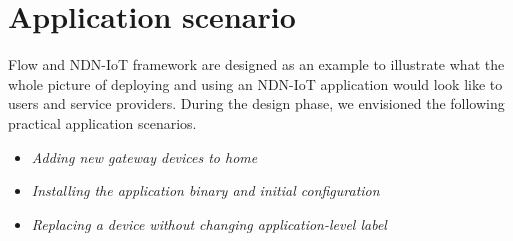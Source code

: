 \section{Application scenario}
\label{sec:scenarios}

Flow and NDN-IoT framework are designed as an example to illustrate what the whole picture of deploying and using an NDN-IoT application would look like to users and service providers.
During the design phase, we envisioned the following practical application scenarios.

\begin{itemize}
\item \emph{Adding new gateway devices to home} 
\item \emph{Installing the application binary and initial configuration} 
\item \emph{Replacing a device without changing application-level label} 
\end{itemize}